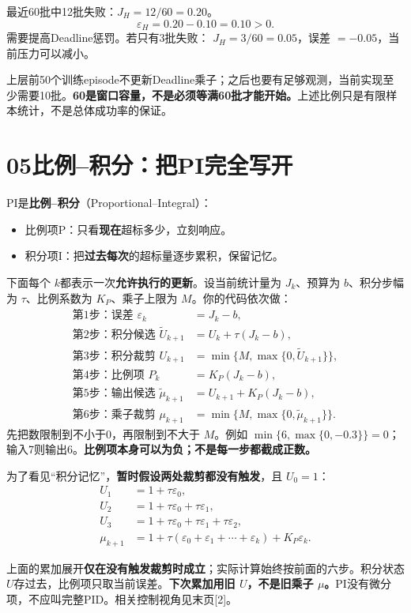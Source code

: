 \documentclass[UTF8,11pt,a4paper,fontset=fandol]{ctexart}
\newcommand{\lesson}[2]{\section*{#1\quad #2}}
\begin{document}
\begin{examplebox}
最近60批中12批失败：$J_H=12/60=0.20$。
\[
\varepsilon_H=0.20-0.10=0.10>0.
\]
需要提高Deadline惩罚。若只有3批失败：
$J_H=3/60=0.05$，误差 $=-0.05$，当前压力可以减小。
\end{examplebox}

上层前50个训练episode不更新Deadline乘子；之后也要有足够观测，当前实现至少需要10批。\textbf{60是窗口容量，不是必须等满60批才能开始。}上述比例只是有限样本统计，不是总体成功率的保证。

\newpage
\lesson{05}{比例--积分：把PI完全写开}
PI是\textbf{比例--积分}（Proportional--Integral）：
\begin{itemize}
\item 比例项P：只看\textbf{现在}超标多少，立刻响应。
\item 积分项I：把\textbf{过去每次}的超标量逐步累积，保留记忆。
\end{itemize}
下面每个 $k$都表示一次\textbf{允许执行的更新}。设当前统计量为 $J_k$、预算为 $b$、积分步幅为 $\tau$、比例系数为 $K_P$、乘子上限为 $M$。你的代码依次做：
\begin{align*}
\text{第1步：误差 }\varepsilon_k &= J_k-b,\\
\text{第2步：积分候选 }\widetilde U_{k+1} &= U_k+\tau(J_k-b),\\
\text{第3步：积分裁剪 }U_{k+1} &=\min\{M,\max\{0,\widetilde U_{k+1}\}\},\\
\text{第4步：比例项 }P_k &=K_P(J_k-b),\\
\text{第5步：输出候选 }\widetilde\mu_{k+1} &=U_{k+1}+K_P(J_k-b),\\
\text{第6步：乘子裁剪 }\mu_{k+1} &=\min\{M,\max\{0,\widetilde\mu_{k+1}\}\}.
\end{align*}
先把数限制到不小于0，再限制到不大于 $M$。例如 $\min\{6,\max\{0,-0.3\}\}=0$；输入7则输出6。\textbf{比例项本身可以为负；不是每一步都截成正数。}

为了看见“积分记忆”，\textbf{暂时假设两处裁剪都没有触发}，且 $U_0=1$：
\begin{align*}
U_1&=1+\tau\varepsilon_0,\\
U_2&=1+\tau\varepsilon_0+\tau\varepsilon_1,\\
U_3&=1+\tau\varepsilon_0+\tau\varepsilon_1+\tau\varepsilon_2,\\
\mu_{k+1}&=1+\tau(\varepsilon_0+\varepsilon_1+\cdots+\varepsilon_k)
               +K_P\varepsilon_k.
\end{align*}
\begin{remember}
上面的累加展开\textbf{仅在没有触发裁剪时成立}；实际计算始终按前面的六步。积分状态 $U$存过去，比例项只取当前误差。\textbf{下次累加用旧 $U$，不是旧乘子 $\mu$。}PI没有微分项，不应叫完整PID。相关控制视角见末页[2]。
\end{remember}
\end{document}
